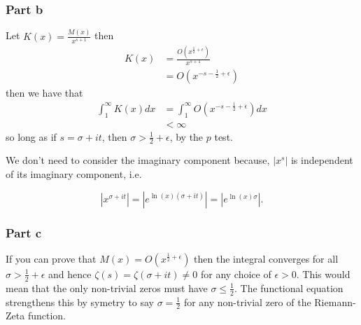 \documentclass{unswmaths}
\begin{document}
\subsubsection*{Part b}

Let $ K(x) = \frac{M(x)}{x^{s+1}} $ then
\begin{align*}
	K(x) &= \frac{O(x^{\frac{1}{2} + \epsilon})}{x^{s+1}} \\
		&= O(x^{-s-\frac{1}{2} + \epsilon})
\end{align*}
then we have that 
\begin{align*}
	\int_1^\infty K(x) dx &= \int_1^\infty O(x^{-s-\frac{1}{2} + \epsilon}) dx \\
		&< \infty
\end{align*}
so long as if $ s = \sigma + it $, then $ \sigma > \frac{1}{2} + \epsilon $, by the $ p $ test.



We don't need to consider the imaginary component because, $| x^s | $ is independent
of its imaginary component, i.e. 

$$ |x^{\sigma + it}| = |e^{\ln(x)(\sigma + it)}| = |e^{\ln(x)\sigma}|. $$

\subsubsection*{Part c}
If you can prove that $ M(x) = O(x^{\frac{1}{2} + \epsilon }) $ then the integral converges for all $ \sigma > \frac{1}{2} + \epsilon $
and hence $ \zeta(s) = \zeta(\sigma + it) \neq 0 $ for any choice of $ \epsilon > 0 $. This would mean that the only non-trivial zeros
must have $ \sigma \leq \frac{1}{2} $. The functional equation strengthens this by symetry to say $ \sigma = \frac{1}{2} $ for any non-trivial
zero of the Riemann-Zeta function.
\end{document}
